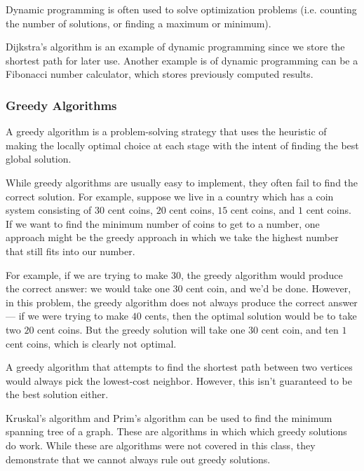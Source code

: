 Dynamic programming is often used to solve optimization problems (i.e. counting the number of solutions, or finding a maximum or minimum). 

Dijkstra's algorithm is an example of dynamic programming since we store the shortest path for later use. Another example is of dynamic programming can be a Fibonacci number calculator, which stores previously computed results. 


\subsubsection{Greedy Algorithms}

A greedy algorithm is a problem-solving strategy that uses the heuristic of making the locally optimal choice at each stage with the intent of finding the best global solution.

While greedy algorithms are usually easy to implement, they often fail to find the correct solution. For example, suppose we live in a country which has a coin system consisting of $30$ cent coins, $20$ cent coins, $15$ cent coins, and $1$ cent coins. If we want to find the minimum number of coins to get to a number, one approach might be the greedy approach in which we take the highest number that still fits into our number. 

For example, if we are trying to make $30$, the greedy algorithm would produce the correct answer: we would take one $30$ cent coin, and we'd be done. However, in this problem, the greedy algorithm does not always produce the correct answer --- if we were trying to make $40$ cents, then the optimal solution would be to take two $20$ cent coins. But the greedy solution will take one $30$ cent coin, and ten $1$ cent coins, which is clearly not optimal.

A greedy algorithm that attempts to find the shortest path between two vertices would always pick the lowest-cost neighbor. However, this isn't guaranteed to be the best solution either. 

Kruskal's algorithm and Prim's algorithm can be used to find the minimum spanning tree of a graph. These are algorithms in which which greedy solutions do work. While these are algorithms were not covered in this class, they demonstrate that we cannot always rule out greedy solutions.